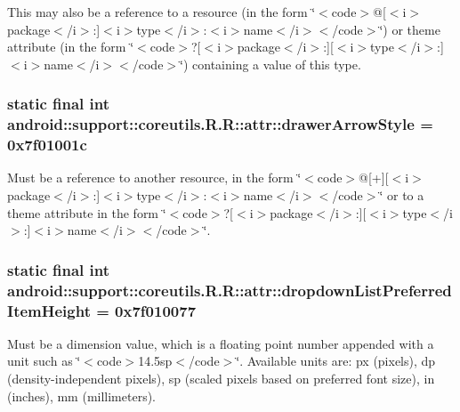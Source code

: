 This may also be a reference to a resource (in the form \char`\"{}$<$code$>$@\mbox{[}$<$i$>$package$<$/i$>$:\mbox{]}$<$i$>$type$<$/i$>$:$<$i$>$name$<$/i$>$$<$/code$>$\char`\"{}) or theme attribute (in the form \char`\"{}$<$code$>$?\mbox{[}$<$i$>$package$<$/i$>$:\mbox{]}\mbox{[}$<$i$>$type$<$/i$>$:\mbox{]}$<$i$>$name$<$/i$>$$<$/code$>$\char`\"{}) containing a value of this type. \hypertarget{classandroid_1_1support_1_1coreutils_1_1_r_1_1attr_2ec6fe06787985a38073d1ada59bd71d}{
\subsubsection[{drawerArrowStyle}]{\setlength{\rightskip}{0pt plus 5cm}static final int android::support::coreutils.R.R::attr::drawerArrowStyle = 0x7f01001c}}
\label{classandroid_1_1support_1_1coreutils_1_1_r_1_1attr_2ec6fe06787985a38073d1ada59bd71d}


Must be a reference to another resource, in the form \char`\"{}$<$code$>$@\mbox{[}+\mbox{]}\mbox{[}$<$i$>$package$<$/i$>$:\mbox{]}$<$i$>$type$<$/i$>$:$<$i$>$name$<$/i$>$$<$/code$>$\char`\"{} or to a theme attribute in the form \char`\"{}$<$code$>$?\mbox{[}$<$i$>$package$<$/i$>$:\mbox{]}\mbox{[}$<$i$>$type$<$/i$>$:\mbox{]}$<$i$>$name$<$/i$>$$<$/code$>$\char`\"{}. \hypertarget{classandroid_1_1support_1_1coreutils_1_1_r_1_1attr_2f20a05f4809a21b21a29c9e1a6cedd5}{
\subsubsection[{dropdownListPreferredItemHeight}]{\setlength{\rightskip}{0pt plus 5cm}static final int android::support::coreutils.R.R::attr::dropdownListPreferredItemHeight = 0x7f010077}}
\label{classandroid_1_1support_1_1coreutils_1_1_r_1_1attr_2f20a05f4809a21b21a29c9e1a6cedd5}


Must be a dimension value, which is a floating point number appended with a unit such as \char`\"{}$<$code$>$14.5sp$<$/code$>$\char`\"{}. Available units are: px (pixels), dp (density-independent pixels), sp (scaled pixels based on preferred font size), in (inches), mm (millimeters). 

